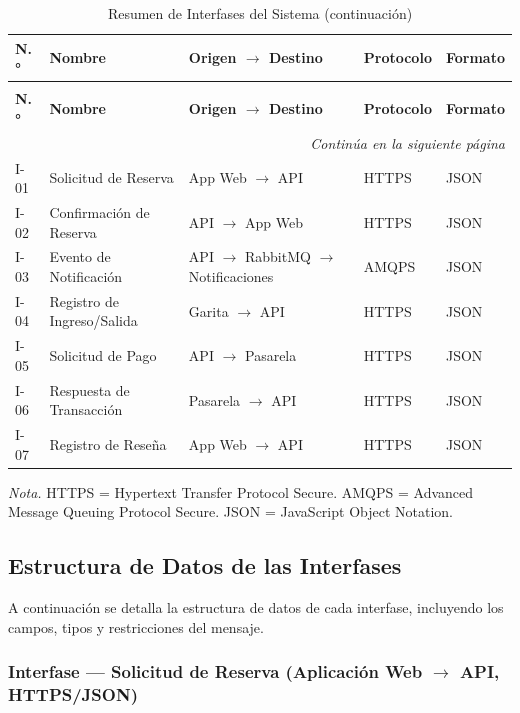 \begin{longtable}{p{0.8cm} p{3cm} p{3.5cm} p{1.8cm} p{4.5cm}}
\caption{Resumen de Interfases del Sistema} \\
\toprule
\textbf{N.°} & \textbf{Nombre} & \textbf{Origen $\rightarrow$ Destino} & \textbf{Protocolo} & \textbf{Formato} \\
\midrule
\endfirsthead

\caption[]{Resumen de Interfases del Sistema (continuación)} \\
\toprule
\textbf{N.°} & \textbf{Nombre} & \textbf{Origen $\rightarrow$ Destino} & \textbf{Protocolo} & \textbf{Formato} \\
\midrule
\endhead

\midrule
\multicolumn{5}{r}{\footnotesize\textit{Continúa en la siguiente página}} \\
\endfoot

\bottomrule
\endlastfoot

I-01 & Solicitud de Reserva & App Web $\rightarrow$ API & HTTPS & JSON \\
I-02 & Confirmación de Reserva & API $\rightarrow$ App Web & HTTPS & JSON \\
I-03 & Evento de Notificación & API $\rightarrow$ RabbitMQ $\rightarrow$ Notificaciones & AMQPS & JSON \\
I-04 & Registro de Ingreso/Salida & Garita $\rightarrow$ API & HTTPS & JSON \\
I-05 & Solicitud de Pago & API $\rightarrow$ Pasarela & HTTPS & JSON \\
I-06 & Respuesta de Transacción & Pasarela $\rightarrow$ API & HTTPS & JSON \\
I-07 & Registro de Reseña & App Web $\rightarrow$ API & HTTPS & JSON \\
\end{longtable}

\textit{Nota.} HTTPS = Hypertext Transfer Protocol Secure. AMQPS = Advanced Message Queuing Protocol Secure. JSON = JavaScript Object Notation.

\subsection{Estructura de Datos de las Interfases}

A continuación se detalla la estructura de datos de cada interfase, incluyendo los campos, tipos y restricciones del mensaje.

\newpage\subsubsection{Interfase --- Solicitud de Reserva (Aplicación Web $\rightarrow$ API, HTTPS/JSON)}

